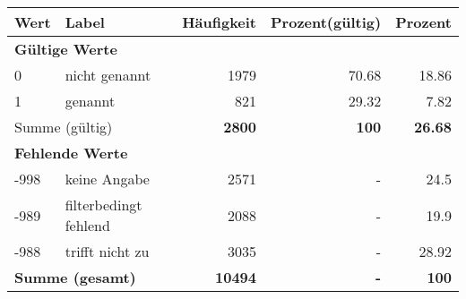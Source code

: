      \begin{longtable}{lXrrr}
     \toprule
     \textbf{Wert} & \textbf{Label} & \textbf{Häufigkeit} & \textbf{Prozent(gültig)} & \textbf{Prozent} \\
     \endhead
     \midrule
     \multicolumn{5}{l}{\textbf{Gültige Werte}}\\

     0 &
     \multicolumn{1}{X}{ nicht genannt   } &


       \num{1979} &
       \num[round-mode=places,round-precision=2]{70,68} &
         \num[round-mode=places,round-precision=2]{18,86} \\

     1 &
     \multicolumn{1}{X}{ genannt   } &


       \num{821} &
       \num[round-mode=places,round-precision=2]{29,32} &
         \num[round-mode=places,round-precision=2]{7,82} \\
     \midrule
     \multicolumn{2}{l}{Summe (gültig)} &
       \textbf{\num{2800}} &
     \textbf{100} &
       \textbf{\num[round-mode=places,round-precision=2]{26,68}} \\
     \multicolumn{5}{l}{\textbf{Fehlende Werte}}\\
       -998 &
       keine Angabe &
         \num{2571} &
        - &
         \num[round-mode=places,round-precision=2]{24,5} \\
       -989 &
       filterbedingt fehlend &
         \num{2088} &
        - &
         \num[round-mode=places,round-precision=2]{19,9} \\
       -988 &
       trifft nicht zu &
         \num{3035} &
        - &
         \num[round-mode=places,round-precision=2]{28,92} \\
     \midrule
     \multicolumn{2}{l}{\textbf{Summe (gesamt)}} &
          \textbf{\num{10494}} &
        \textbf{-} &
        \textbf{100} \\
     \bottomrule
     \end{longtable}
     
